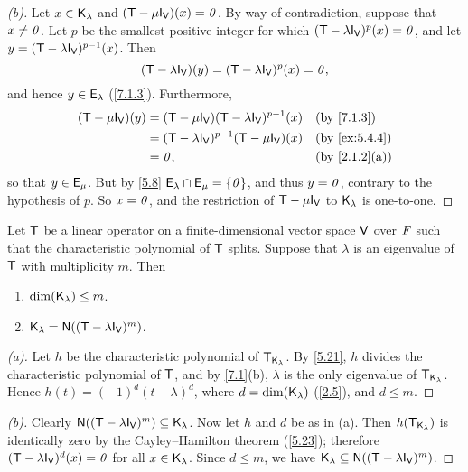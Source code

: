 \begin{proof}[(b)]
  Let \(x \in \mathsf{K}_{\lambda}\) and \((\T - \mu \IT[\V])(x) = \zv\).
  By way of contradiction, suppose that \(x \neq \mathit{0}\).
  Let \(p\) be the smallest positive integer for which \((\T - \lambda \IT[\V])^p(x) = \zv\), and let \(y = (\T - \lambda \IT[\V])^{p - 1}(x)\).
  Then
  \[
    (\T - \lambda \IT[\V])(y) = (\T - \lambda \IT[\V])^p(x) = \zv,
  \]
  and hence \(y \in \mathsf{E}_{\lambda}\) (\cref{7.1.3}).
  Furthermore,
  \begin{align*}
    (\T - \mu \IT[\V])(y) & = (\T - \mu \IT[\V]) (\T - \lambda \IT[\V])^{p - 1}(x)  &  & \by{7.1.3}    \\
                          & = (\T - \lambda \IT[\V])^{p - 1} (\T - \mu \IT[\V]) (x) &  & \by{ex:5.4.4} \\
                          & = \zv,                                                  &  & \by{2.1.2}[a]
  \end{align*}
  so that \(y \in \mathsf{E}_{\mu}\).
  But by \cref{5.8} \(\mathsf{E}_{\lambda} \cap \mathsf{E}_{\mu} = \left\lbrace\mathit{0}\right\rbrace\), and thus \(y = \mathit{0}\), contrary to the hypothesis of \(p\).
  So \(x = \mathit{0}\), and the restriction of \(\T - \mu \IT[\V]\) to \(\mathsf{K}_{\lambda}\) is one-to-one.
\end{proof}

\begin{thm}\label{7.2}
  Let \(\mathsf{T}\) be a linear operator on a finite-dimensional vector space \(\mathsf{V}\) over \(\mathit{F}\) such that the characteristic polynomial of \(\mathsf{T}\) splits.
  Suppose that \(\lambda\) is an eigenvalue of \(\mathsf{T}\) with multiplicity \(m\).
  Then
  \begin{enumerate}
    \item \(\dim(\mathsf{K}_{\lambda}) \leq m\).
    \item \(\vs{K}_{\lambda} = \ns{(\T - \lambda \IT[\V])^m}\).
  \end{enumerate}
\end{thm}

\begin{proof}[(a)]
  Let \(h\) be the characteristic polynomial of \(\mathsf{T}_{\mathsf{K}_{\lambda}}\).
  By \cref{5.21}, \(h\) divides the characteristic polynomial of \(\mathsf{T}\), and by \cref{7.1}(b), \(\lambda\) is the only eigenvalue of \(\mathsf{T}_{\mathsf{K}_{\lambda}}\).
  Hence \(h(t) = (-1)^d (t - \lambda)^d\), where \(d = \dim(\mathsf{K}_{\lambda})\) (\cref{2.5}), and \(d \leq m\).
\end{proof}

\begin{proof}[(b)]
  Clearly \(\ns{(\T - \lambda \IT[\V])^m} \subseteq \vs{K}_{\lambda}\).
  Now let \(h\) and \(d\) be as in (a).
  Then \(h(\mathsf{T}_{\mathsf{K}_{\lambda}})\) is identically zero by the Cayley--Hamilton theorem (\cref{5.23});
  therefore \((\T - \lambda \IT[\V])^d(x) = \zv\) for all \(x \in \mathsf{K}_{\lambda}\).
  Since \(d \leq m\), we have \(\vs{K}_{\lambda} \subseteq \ns{(\T - \lambda \IT[\V])^m}\).
\end{proof}

